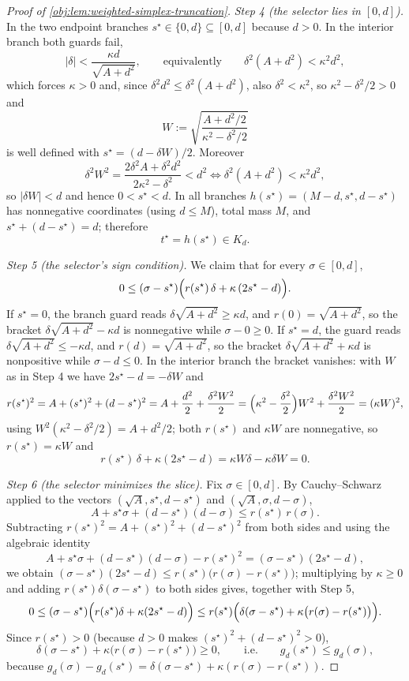 \begin{proof}[Proof of \cref{obj:lem:weighted-simplex-truncation}]
\emph{Step 4 (the selector lies in \([0,d]\)).}  In the two endpoint branches \(s^\star\in\{0,d\}\subseteq[0,d]\) because \(d>0\).  In the interior branch both guards fail,
\[
|\delta|<\frac{\kappa d}{\sqrt{A+d^2}},
\qquad\text{equivalently}\qquad
\delta^2(A+d^2)<\kappa^2d^2 ,
\]
which forces \(\kappa>0\) and, since \(\delta^2d^2\le\delta^2(A+d^2)\), also \(\delta^2<\kappa^2\), so \(\kappa^2-\delta^2/2>0\) and
\[
W:=\sqrt{\frac{A+d^2/2}{\kappa^2-\delta^2/2}}
\]
is well defined with \(s^\star=(d-\delta W)/2\).  Moreover
\[
\delta^2W^2=\frac{2\delta^2A+\delta^2d^2}{2\kappa^2-\delta^2}<d^2
\iff
\delta^2(A+d^2)<\kappa^2d^2 ,
\]
so \(|\delta W|<d\) and hence \(0<s^\star<d\).  In all branches \(h(s^\star)=(M-d,s^\star,d-s^\star)\) has nonnegative coordinates (using \(d\le M\)), total mass \(M\), and \(s^\star+(d-s^\star)=d\); therefore
\[
t^\star=h(s^\star)\in K_d .
\]

\emph{Step 5 (the selector's sign condition).}  We claim that for every \(\sigma\in[0,d]\),
\[
0\le(\sigma-s^\star)\Bigl(r(s^\star)\,\delta+\kappa\,(2s^\star-d)\Bigr).
\]
If \(s^\star=0\), the branch guard reads \(\delta\sqrt{A+d^2}\ge\kappa d\), and \(r(0)=\sqrt{A+d^2}\), so the bracket \(\delta\sqrt{A+d^2}-\kappa d\) is nonnegative while \(\sigma-0\ge0\).  If \(s^\star=d\), the guard reads \(\delta\sqrt{A+d^2}\le-\kappa d\), and \(r(d)=\sqrt{A+d^2}\), so the bracket \(\delta\sqrt{A+d^2}+\kappa d\) is nonpositive while \(\sigma-d\le0\).  In the interior branch the bracket vanishes: with \(W\) as in Step 4 we have \(2s^\star-d=-\delta W\) and
\[
r(s^\star)^2=A+(s^\star)^2+(d-s^\star)^2
=A+\frac{d^2}{2}+\frac{\delta^2W^2}{2}
=\Bigl(\kappa^2-\frac{\delta^2}{2}\Bigr)W^2+\frac{\delta^2W^2}{2}
=(\kappa W)^2 ,
\]
using \(W^2(\kappa^2-\delta^2/2)=A+d^2/2\); both \(r(s^\star)\) and \(\kappa W\) are nonnegative, so \(r(s^\star)=\kappa W\) and
\[
r(s^\star)\,\delta+\kappa(2s^\star-d)=\kappa W\delta-\kappa\delta W=0 .
\]

\emph{Step 6 (the selector minimizes the slice).}  Fix \(\sigma\in[0,d]\).  By Cauchy--Schwarz applied to the vectors \((\sqrt A,s^\star,d-s^\star)\) and \((\sqrt A,\sigma,d-\sigma)\),
\[
A+s^\star\sigma+(d-s^\star)(d-\sigma)\le r(s^\star)\,r(\sigma).
\]
Subtracting \(r(s^\star)^2=A+(s^\star)^2+(d-s^\star)^2\) from both sides and using the algebraic identity
\[
A+s^\star\sigma+(d-s^\star)(d-\sigma)-r(s^\star)^2=(\sigma-s^\star)(2s^\star-d),
\]
we obtain \((\sigma-s^\star)(2s^\star-d)\le r(s^\star)\bigl(r(\sigma)-r(s^\star)\bigr)\); multiplying by \(\kappa\ge0\) and adding \(r(s^\star)\delta(\sigma-s^\star)\) to both sides gives, together with Step 5,
\[
0\le(\sigma-s^\star)\Bigl(r(s^\star)\delta+\kappa(2s^\star-d)\Bigr)
\le r(s^\star)\Bigl(\delta(\sigma-s^\star)+\kappa\bigl(r(\sigma)-r(s^\star)\bigr)\Bigr).
\]
Since \(r(s^\star)>0\) (because \(d>0\) makes \((s^\star)^2+(d-s^\star)^2>0\)),
\[
\delta(\sigma-s^\star)+\kappa\bigl(r(\sigma)-r(s^\star)\bigr)\ge0,
\qquad\text{i.e.}\qquad
g_d(s^\star)\le g_d(\sigma),
\]
because \(g_d(\sigma)-g_d(s^\star)=\delta(\sigma-s^\star)+\kappa(r(\sigma)-r(s^\star))\). %


\end{proof}
